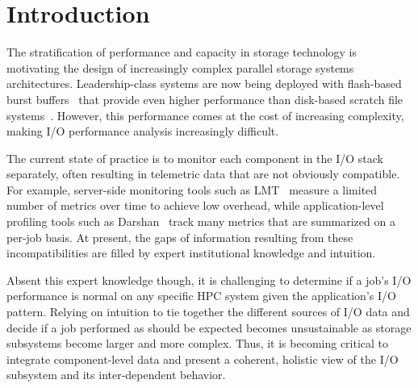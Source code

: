 \section{Introduction} \label{sec:introduction}

The stratification of performance and capacity in storage technology is motivating the design of increasingly complex parallel storage systems architectures.
Leadership-class systems are now being deployed with flash-based burst buffers~\cite{Henseler2016} that provide even higher performance than disk-based scratch file systems~\cite{Bhimji2016}.
However, this performance comes at the cost of increasing complexity, making I/O performance analysis increasingly difficult.

The current state of practice is to monitor each component in the I/O stack separately, often resulting in telemetric data that are not obviously compatible.
For example, server-side monitoring tools such as LMT~\cite{lmt} measure a limited number of metrics over time to achieve low overhead, while application-level profiling tools such as Darshan~\cite{carns200924} track many metrics that are summarized on a per-job basis.
At present, the gaps of information resulting from these incompatibilities are filled by expert institutional knowledge and intuition.

Absent this expert knowledge though, it is challenging to determine if a job's I/O performance is normal on any specific HPC system given the application's I/O pattern.
Relying on intuition to tie together the different sources of I/O data and decide if a job performed as should be expected becomes unsustainable as storage subsystems become larger and more complex.  
Thus, it is becoming critical to integrate component-level data and present a coherent, holistic view of the I/O subsystem and its inter-dependent behavior.

